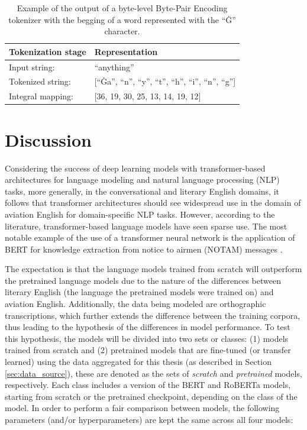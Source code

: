\documentclass[12pt]{article}
\begin{document}
\begin{table}[!t]
    \centering
    \begin{tabular}{l l}
        \toprule
        Tokenization stage & Representation                                            \\
        \midrule
        Input string:      & ``anything''                                              \\
        Tokenized string:  & [``Ġa'', ``n'', ``y'', ``t'', ``h'', ``i'', ``n'', ``g''] \\
        Integral mapping:  & [36, 19, 30, 25, 13, 14, 19, 12]                          \\
        \bottomrule
    \end{tabular}
    \caption{Example of the output of a byte-level Byte-Pair Encoding tokenizer with the begging of a word represented with the ``Ġ'' character.}
    \label{tab:byte_level_bpe_example}
\end{table}

\section{Discussion}\label{sec:discussion}
Considering the success of deep learning models with transformer-based architectures for language modeling and natural language processing (NLP)
tasks, more generally, in the conversational and literary English domains, it follows that transformer architectures should see widespread use in the
domain of aviation English for domain-specific NLP tasks. However, according to the literature, transformer-based language models have seen sparse
use. The most notable example of the use of a transformer neural network is the application of BERT for knowledge extraction from notice to airmen
(NOTAM) messages \cite{arnold_knowledge_2022}.

The expectation is that the language models trained from scratch will outperform the pretrained language models due to the nature of the differences
between literary English (the language the pretrained models were trained on) and aviation English. Additionally, the data being modeled are
orthographic transcriptions, which further extends the difference between the training corpora, thus leading to the hypothesis of the differences
in model performance. To test this hypothesis, the models will be divided into two sets or classes: (1) models trained from scratch and (2) pretrained
models that are fine-tuned (or transfer learned) using the data aggregated for this thesis (as described in Section \ref{sec:data_source}), these are
denoted as the sets of \textit{scratch} and \textit{pretrained} models, respectively. Each class includes a version of the BERT and RoBERTa models,
starting from scratch or the pretrained checkpoint, depending on the class of the model. In order to perform a fair comparison between models, the
following parameters (and/or hyperparameters) are kept the same across all four models:
\end{document}
